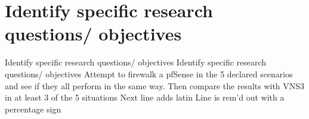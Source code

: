 \documentclass[12pt]{report}
\begin{document}
\newpage
\section*{Identify specific research questions/ objectives}
Identify specific research questions/ objectives
\newline
Identify specific research questions/ objectives
Attempt to firewalk a pfSense in the 5 declared scenarios and see if they all perform in the same way.
Then compare the results with VNS3 in at least 3 of the 5 situations
\newline
Next line adds latin
Line is rem'd out with a percentage sign
\newline

\newpage
\end{document}
